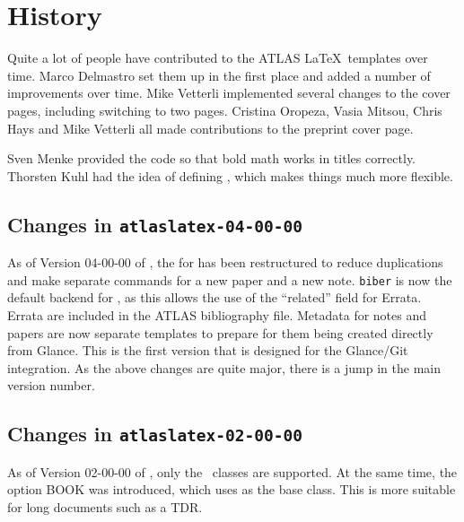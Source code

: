 \section{History}

Quite a lot of people have contributed to the ATLAS \LaTeX\ templates over time.
Marco Delmastro set them up in the first place and added a number of improvements over time.
Mike Vetterli implemented several changes to the cover pages, including switching to two pages.
Cristina Oropeza, Vasia Mitsou, Chris Hays and Mike Vetterli all made contributions to the preprint cover page.

Sven Menke provided the code so that bold math works in titles correctly.
Thorsten Kuhl had the idea of defining , which makes things much more flexible.


\subsection{Changes in \texttt{atlaslatex-04-00-00}}
\label{sec:atlaslatex4}

As of Version 04-00-00 of , the  for  has been  restructured to reduce duplications and make separate commands for a new paper and a new note.
\texttt{biber} is now the default backend for ,
as this allows the use of the \enquote{related} field for Errata.
Errata are included in the ATLAS bibliography file.
Metadata for notes and papers are now separate templates to prepare for them being created directly from Glance.
This is the first version that is designed for the Glance/Git integration.
As the above changes are quite major, there is a jump in the main version number.


\subsection{Changes in \texttt{atlaslatex-02-00-00}}
\label{sec:atlaslatex2}

As of Version 02-00-00 of , only the \KOMAScript\ classes are supported.
At the same time, the option BOOK was introduced, which uses  as the base class.
This is more suitable for long documents such as a TDR.


